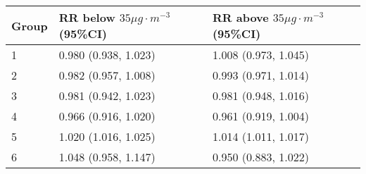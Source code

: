 \begin{tabular}{lll}
  \hline
Group & RR below $35 \mu g \cdot m^{-3}$ (95\%CI) & RR above $35 \mu g \cdot m^{-3}$ (95\%CI) \\ 
  \hline
   1 & 0.980 (0.938, 1.023) & 1.008 (0.973, 1.045) \\ 
     2 & 0.982 (0.957, 1.008) & 0.993 (0.971, 1.014) \\ 
     3 & 0.981 (0.942, 1.023) & 0.981 (0.948, 1.016) \\ 
     4 & 0.966 (0.916, 1.020) & 0.961 (0.919, 1.004) \\ 
     5 & 1.020 (1.016, 1.025) & 1.014 (1.011, 1.017) \\ 
     6 & 1.048 (0.958, 1.147) & 0.950 (0.883, 1.022) \\ 
   \hline
\end{tabular}

